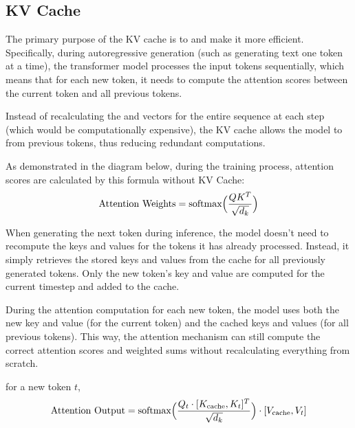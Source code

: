 \documentclass[letterpaper,11pt,english]{sphinxmanual}
\begin{document}
\subsection{KV Cache}
\label{\detokenize{pretraining:kv-cache}}
\sphinxAtStartPar
The primary purpose of the KV cache is to  and make it more efficient. Specifically, during
autoregressive generation (such as generating text one token at a time),
the transformer model processes the input tokens sequentially, which
means that for each new token, it needs to compute the attention scores
between the current token and all previous tokens.

\sphinxAtStartPar
Instead of recalculating the  and  vectors for
the entire sequence at each step (which would be computationally
expensive), the KV cache allows the model to  from previous tokens, thus reducing redundant computations.

\sphinxAtStartPar
As demonstrated in the diagram below, during the training process,
attention scores are calculated by this formula without KV Cache:
\begin{equation*}
\begin{split}\text{Attention Weights} = \text{softmax}\Big({QK^T\over{\sqrt{d_k}}}\Big)\end{split}
\end{equation*}
\sphinxAtStartPar
{}

\sphinxAtStartPar
When generating the next token during inference, the model doesn’t need
to recompute the keys and values for the tokens it has already
processed. Instead, it simply retrieves the stored keys and values from
the cache for all previously generated tokens. Only the new token’s key
and value are computed for the current timestep and added to the cache.

\sphinxAtStartPar
During the attention computation for each new token, the model uses both
the new key and value (for the current token) and the cached keys and
values (for all previous tokens). This way, the attention mechanism can
still compute the correct attention scores and weighted sums without
recalculating everything from scratch.

\sphinxAtStartPar
{} for a new token \(t\),
\begin{equation*}
\begin{split}\text{Attention Output} = \text{softmax} \Big({Q_t \cdot [K_{\text{cache}}, K_t]^T\over \sqrt{d_k}}\Big) \cdot [V_{\text{cache}}, V_t]\end{split}
\end{equation*}
\sphinxAtStartPar
{}
\end{document}
